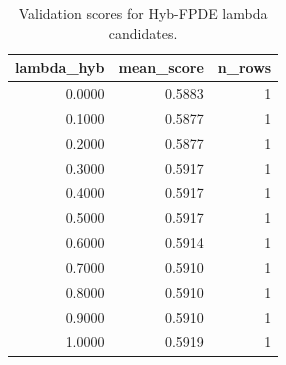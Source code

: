 \begin{table}[t]
\caption{Validation scores for Hyb-FPDE lambda candidates.}
\label{tab:lambda_distribution_computed}
\centering
\begin{tabular}{rrr}
\toprule
lambda\_hyb & mean\_score & n\_rows \\
\midrule
0.0000 & 0.5883 & 1 \\
0.1000 & 0.5877 & 1 \\
0.2000 & 0.5877 & 1 \\
0.3000 & 0.5917 & 1 \\
0.4000 & 0.5917 & 1 \\
0.5000 & 0.5917 & 1 \\
0.6000 & 0.5914 & 1 \\
0.7000 & 0.5910 & 1 \\
0.8000 & 0.5910 & 1 \\
0.9000 & 0.5910 & 1 \\
1.0000 & 0.5919 & 1 \\
\bottomrule
\end{tabular}

\end{table}

